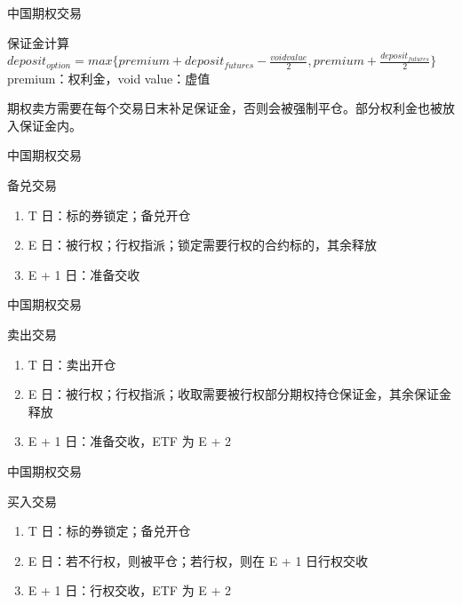 \documentclass[12pt]{ctexbeamer}	%
\begin{document}
\begin{frame}{中国期权交易}
  \begin{block}{保证金计算}
    \large{$deposit_{option} = max\{ premium + deposit_{futures} - \frac{void value}{2} , premium + \frac{deposit_{futures}}{2} \}$}\\
    premium：权利金，void value：虚值
  \end{block}
  期权卖方需要在每个交易日末补足保证金，否则会被强制平仓。部分权利金也被放入保证金内。
\end{frame}

\begin{frame}{中国期权交易}
  \begin{block}{备兑交易}
    \begin{enumerate}
      \item T 日：标的券锁定；备兑开仓
      \item E 日：被行权；行权指派；锁定需要行权的合约标的，其余释放
      \item E + 1 日：准备交收
    \end{enumerate}
  \end{block}
\end{frame}

\begin{frame}{中国期权交易}
  \begin{block}{卖出交易}
    \begin{enumerate}
      \item T 日：卖出开仓
      \item E 日：被行权；行权指派；收取需要被行权部分期权持仓保证金，其余保证金释放
      \item E + 1 日：准备交收，ETF 为 E + 2
    \end{enumerate}
  \end{block}
\end{frame}

\begin{frame}{中国期权交易}
  \begin{block}{买入交易}
    \begin{enumerate}
      \item T 日：标的券锁定；备兑开仓
      \item E 日：若不行权，则被平仓；若行权，则在 E + 1 日行权交收
      \item E + 1 日：行权交收，ETF 为 E + 2
    \end{enumerate}
  \end{block}
\end{frame}
\end{document}
